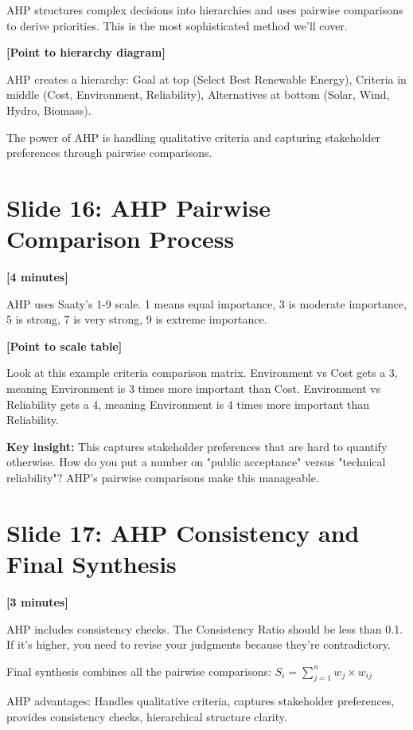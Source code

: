 \documentclass[12pt]{article}
\begin{document}
AHP structures complex decisions into hierarchies and uses pairwise comparisons to derive priorities. This is the most sophisticated method we'll cover.

\textcolor{speakernote}{\textbf{[Point to hierarchy diagram]}}

AHP creates a hierarchy: Goal at top (Select Best Renewable Energy), Criteria in middle (Cost, Environment, Reliability), Alternatives at bottom (Solar, Wind, Hydro, Biomass).

The power of AHP is handling qualitative criteria and capturing stakeholder preferences through pairwise comparisons.

\section*{Slide 16: AHP Pairwise Comparison Process}
\textcolor{timing}{\textbf{[4 minutes]}}

AHP uses Saaty's 1-9 scale. 1 means equal importance, 3 is moderate importance, 5 is strong, 7 is very strong, 9 is extreme importance.

\textcolor{speakernote}{\textbf{[Point to scale table]}}

Look at this example criteria comparison matrix. Environment vs Cost gets a 3, meaning Environment is 3 times more important than Cost. Environment vs Reliability gets a 4, meaning Environment is 4 times more important than Reliability.

\textcolor{emphasis}{\textbf{Key insight:}} This captures stakeholder preferences that are hard to quantify otherwise. How do you put a number on "public acceptance" versus "technical reliability"? AHP's pairwise comparisons make this manageable.

\section*{Slide 17: AHP Consistency and Final Synthesis}
\textcolor{timing}{\textbf{[3 minutes]}}

AHP includes consistency checks. The Consistency Ratio should be less than 0.1. If it's higher, you need to revise your judgments because they're contradictory.

Final synthesis combines all the pairwise comparisons: $S_i = \sum_{j=1}^{n} w_j \times w_{ij}$

AHP advantages: Handles qualitative criteria, captures stakeholder preferences, provides consistency checks, hierarchical structure clarity.
\end{document}
